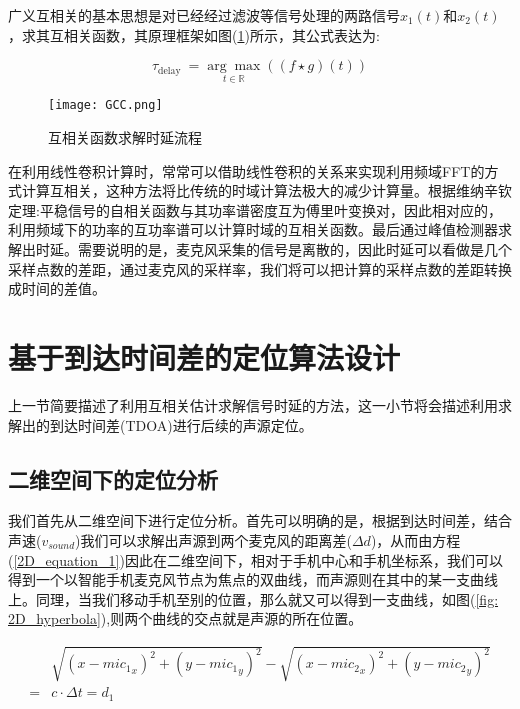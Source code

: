 \documentclass[winfonts]{njuthesis}
\begin{document}
		广义互相关的基本思想是对已经经过滤波等信号处理的两路信号$x_1(t)$和$x_2(t)$，求其互相关函数，其原理框架如图(\ref{fig: GCC})所示，其公式表达为:
		
		\begin{equation}
		\tau_{\text {delay }}=\underset{t \in \mathbb{R}}{\arg \max }((f \star g)(t))
		\end{equation}
		
		\begin{figure}[H]
			\centering
			\texttt{[image: GCC.png]} 
			\caption{互相关函数求解时延流程}
			\label{fig: GCC}
		\end{figure}	
		
		在利用线性卷积计算时，常常可以借助线性卷积的关系来实现利用频域FFT的方式计算互相关，这种方法将比传统的时域计算法极大的减少计算量。根据维纳辛钦定理:平稳信号的自相关函数与其功率谱密度互为傅里叶变换对，因此相对应的，利用频域下的功率的互功率谱可以计算时域的互相关函数。最后通过峰值检测器求解出时延。需要说明的是，麦克风采集的信号是离散的，因此时延可以看做是几个采样点数的差距，通过麦克风的采样率，我们将可以把计算的采样点数的差距转换成时间的差值。
	
	\section{基于到达时间差的定位算法设计}
	
		上一节简要描述了利用互相关估计求解信号时延的方法，这一小节将会描述利用求解出的到达时间差(TDOA)进行后续的声源定位。
		
		\subsection{二维空间下的定位分析}
		
		我们首先从二维空间下进行定位分析。首先可以明确的是，根据到达时间差，结合声速($v_{sound}$)我们可以求解出声源到两个麦克风的距离差($\Delta d$)，从而由方程(\ref{2D_equation_1})因此在二维空间下，相对于手机中心和手机坐标系，我们可以得到一个以智能手机麦克风节点为焦点的双曲线，而声源则在其中的某一支曲线上。同理，当我们移动手机至别的位置，那么就又可以得到一支曲线，如图(\ref{fig: 2D_hyperbola}),则两个曲线的交点就是声源的所在位置。
		
		\begin{equation}
		\begin{aligned}
			&\sqrt{(x-{mic_1}_x)^2+(y-{mic_1}_y)^2} - \sqrt{(x-{mic_2}_x)^2+(y-{mic_2}_y)^2}\\
		  = & c \cdot \Delta t= d_1 \label{2D_equation_1}
		\end{aligned}
		\end{equation}
		
\end{document}
